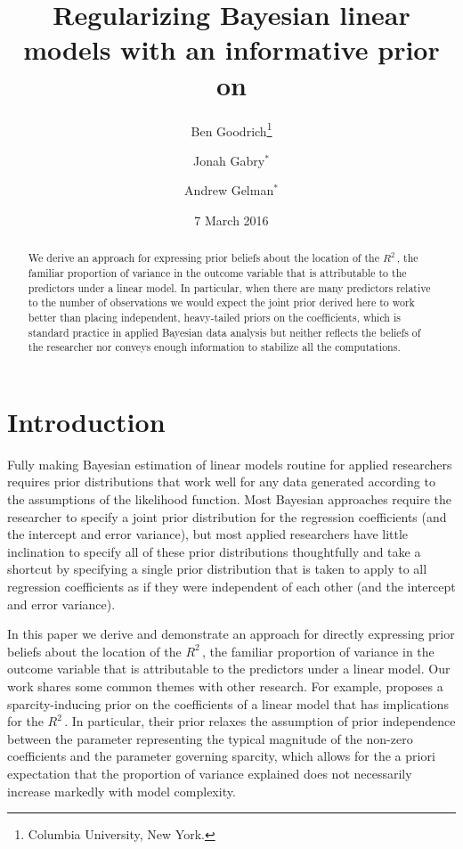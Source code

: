 \documentclass[11pt]{article}
\title{\bf Regularizing Bayesian linear models with an informative prior on \Rsq
    \vspace{.1in}}
\author{Ben Goodrich\footnote{Columbia University, New York.}
    \and Jonah Gabry$^\ast$
    \and Andrew Gelman$^\ast$
    \vspace{.1in}}
\date{7 March 2016
    \vspace{-.2in}}
\newcommand{\Rsq}{$R^2\,$}
\begin{document}
\maketitle
\thispagestyle{empty}

\begin{abstract}
\noindent We derive an approach for expressing prior beliefs about the location
of the \Rsq, the familiar proportion of variance in the outcome variable that is
attributable to the predictors under a linear model. In particular, when there
are many predictors relative to the number of observations we would expect the
joint prior derived here to work better than placing independent, heavy-tailed
priors on the coefficients, which is  standard practice in applied Bayesian data
analysis but neither reflects the beliefs of the researcher nor conveys enough
information to stabilize all the computations.
\end{abstract}


\section{Introduction}

Fully making Bayesian estimation of linear models routine for applied
researchers requires prior distributions that work well for any data generated
according to the assumptions of the likelihood function. Most Bayesian
approaches require the researcher to specify a joint prior distribution for the
regression coefficients (and the intercept and error variance), but most applied
researchers have little inclination to specify all of these prior distributions
thoughtfully and take a shortcut by specifying a single prior distribution that
is taken to apply to all regression coefficients as if they were independent of
each other (and the intercept and error variance).

In this paper we derive and demonstrate an approach for directly expressing
prior beliefs about the location of the \Rsq, the familiar proportion of
variance in the outcome variable that is attributable to the predictors under a
linear model. Our work shares some common themes with other research. For
example,  proposes a sparcity-inducing prior on the
coefficients of a linear model that has implications for the \Rsq. In
particular, their prior relaxes the assumption of prior independence between the
parameter representing the typical magnitude of the non-zero coefficients and
the parameter governing sparcity, which allows for the a priori expectation that
the proportion of variance explained does not necessarily increase markedly with
model complexity.
\end{document}
